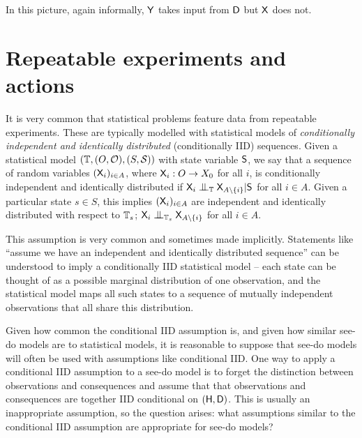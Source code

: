 In this picture, again informally, $\mathsf{Y}$ takes input from $\mathsf{D}$ but $\mathsf{X}$ does not.    

\section{Repeatable experiments and actions}\label{sec:repeatable_experiments}

It is very common that statistical problems feature data from repeatable experiments. These are typically modelled with statistical models of \emph{conditionally independent and identically distributed} (conditionally IID) sequences. Given a statistical model $(\mathbb{T}, (O,\mathcal{O}), (S,\mathcal{S}))$ with state variable $\mathsf{S}$, we say that a sequence of random variables $(\mathsf{X}_i)_{i\in A}$, where $\mathsf{X}_i:O\to X_0$ for all $i$, is conditionally independent and identically distributed if $\RV{X}_i\CI_{\kernel{T}}\RV{X}_{A\setminus \{i\}}|\RV{S}$ for all $i\in A$. Given a particular state $s\in S$, this implies $(\mathsf{X}_i)_{i\in A}$ are independent and identically distributed with respect to $\mathbb{T}_s$; $\RV{X}_i\CI_{\kernel{T}_s} \RV{X}_{A\setminus \{i\}}$ for all $i\in A$.

This assumption is very common and sometimes made implicitly. Statements like ``assume we have an independent and identically distributed sequence'' can be understood to imply a conditionally IID statistical model -- each state can be thought of as a possible marginal distribution of one observation, and the statistical model maps all such states to a sequence of mutually independent observations that all share this distribution.

Given how common the conditional IID assumption is, and given how similar see-do models are to statistical models, it is reasonable to suppose that see-do models will often be used with assumptions like conditional IID. One way to apply a conditional IID assumption to a see-do model is to forget the distinction between observations and consequences and assume that that observations and consequences are together IID conditional on $(\mathsf{H},\mathsf{D})$. This is usually an inappropriate assumption, so the question arises: what assumptions similar to the conditional IID assumption are appropriate for see-do models?

